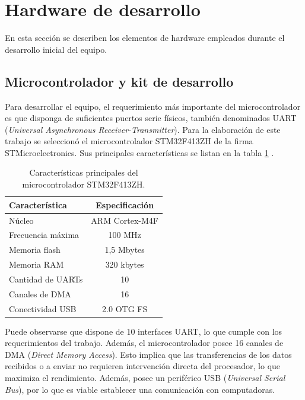 

\section{Hardware de desarrollo}

En esta sección se describen los elementos de hardware empleados durante el desarrollo inicial del equipo.

\subsection{Microcontrolador y kit de desarrollo}
Para desarrollar el equipo, el requerimiento más importante del microcontrolador es que disponga de suficientes puertos serie físicos, también denominados UART (\textit{Universal Asynchronous Receiver-Transmitter}). Para la elaboración de este trabajo se seleccionó el microcontrolador STM32F413ZH de la firma STMicroelectronics. Sus principales características se listan en la tabla \ref{tab:stm32f413zh-traits} \cite{st:stm32f413-ds}.

\begin{table}[h]
	\centering
	\caption{Características principales del microcontrolador STM32F413ZH.}
	\label{tab:stm32f413zh-traits}
	\begin{tabular}{lc}
		\toprule
		\textbf{Característica} & \textbf{Especificación} \\
		\midrule
		Núcleo                  & ARM Cortex-M4F          \\
		Frecuencia máxima       & 100 MHz                 \\
		Memoria flash           & 1,5 Mbytes              \\
		Memoria RAM             & 320 kbytes              \\
		Cantidad de UARTs       & 10                      \\
		Canales de DMA          & 16                      \\
		Conectividad USB        & 2.0 OTG FS              \\
		\bottomrule
		\hline
	\end{tabular}
\end{table}

Puede observarse que dispone de 10 interfaces UART, lo que cumple con los requerimientos del trabajo. Además, el microcontrolador posee 16 canales de DMA (\textit{Direct Memory Access}). Esto implica que las transferencias de los datos recibidos o a enviar no requieren intervención directa del procesador, lo que maximiza el rendimiento. Además, posee un periférico USB (\textit{Universal Serial Bus}), por lo que es viable establecer una comunicación con computadoras.

